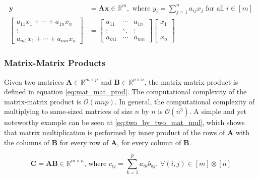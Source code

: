         \begin{align} \label{eq:mat_vec_prod}
            \mathbf{y} & = \mathbf{Ax} \in \mathbb{R}^{m}, \text{ where } y_i = \sum_{j=1}^{n}a_{ij}x_j \text{ for all } i \in [m] \\
            \left[
                \begin{array}{c}
                    a_{11}x_1 + \cdots + a_{1n}x_n \\
                    \vdots \\
                    a_{m1}x_1 + \cdots + a_{mn}x_n
                \end{array}
            \right]
            & =
            \left[
                \begin{array}{ccc}
                    a_{11} & \cdots & a_{1n} \\
                    \vdots & \ddots & \vdots \\
                    a_{m1} & \cdots & a_{mn}
                \end{array}
            \right]
            \left[
                \begin{array}{c}
                    x_1 \\
                    \vdots \\
                    x_n
                \end{array}
            \right] \nonumber
        \end{align}
    

    \subsubsection{Matrix-Matrix Products} \label{sec:Matrix-Matrix Products}
        Given two matrices $\mathbf{A} \in \mathbb{R}^{m\times p}$ and
        $\mathbf{B} \in \mathbb{R}^{p\times n}$, the matrix-matrix product is
        defined in equation \ref{eq:mat_mat_prod}. The computational complexity
        of the matrix-matrix product is $\mathcal{O}(mnp)$. In general, the
        computational complexity of multiplying to same-sized matrices of size
        $n$ by $n$ is $\mathcal{O}(n^3)$. A simple and yet noteworthy example
        can be seen at \ref{eq:two_by_two_mat_mul}, which shows that matrix
        multiplication is performed by inner product of the rows of $\mathbf{A}$
        with the columns of $\mathbf{B}$ for every row of $\mathbf{A}$, for every column of
        $\mathbf{B}$. 

        \begin{equation} \label{eq:mat_mat_prod}
            \mathbf{C = AB}\in \mathbb{R}^{m\times n} \text{, where } c_{ij} = \sum_{k=1}^{p} a_{ik}b_{kj}\text{, } \forall (i, j) \in [m]\otimes [n]
        \end{equation}

